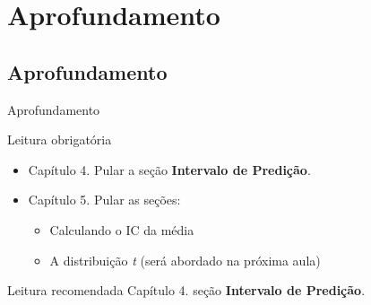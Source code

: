 \documentclass{beamer}
\begin{document}
\section{Aprofundamento}

\subsection{Aprofundamento}

\begin{frame}{\scriptsize Aprofundamento}
  \begin{block}{Leitura obrigatória}
    \begin{itemize}
      \footnotesize
    \item Capítulo 4. Pular a seção {\bf Intervalo de Predição}.
    \item Capítulo 5. Pular as seções:
      \begin{itemize}
        \scriptsize
      \item Calculando o IC da média
      \item A distribuição {\em t} ({\tiny será abordado na próxima aula})
      \end{itemize}
    \end{itemize}
  \end{block}
  \begin{block}{Leitura recomendada}
    \scriptsize
    Capítulo 4. seção {\bf Intervalo de Predição}.
  \end{block}
\end{frame}
\end{document}
